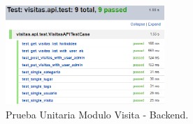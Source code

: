 \documentclass[12pt,letterpaper,openany]{book}
\begin{document}
\begin{figure}[H]
\begin{center}
\includegraphics[width=6cm]{./imagenes/Test/Backend/Test__visitas_api_test}
\caption{Prueba Unitaria Modulo Visita - Backend.}
\end{center}
\end{figure}
\cleardoublepage
{}
\end{document}
